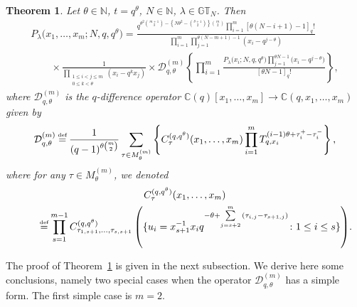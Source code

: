 \documentclass[pdftex]{sigma}
\numberwithin{equation}{section}
\newcommand\myeq{\mathrel{\stackrel{\makebox[0pt]{\mbox{\normalfont\tiny def}}}{=}}}
\newtheorem{thm}{Theorem}[section]
\newcommand{\C}{\mathbb{C}}
\newcommand{\N}{\mathbb{N}}
\newcommand{\GT}{\mathbb{GT}}
\newcommand{\DD}{\mathcal{D}}
\begin{document}
\begin{thm}\label{macdonaldthm3}
Let $\theta\in\N$, $t = q^{\theta}$, $N\in\N$, $\lambda\in\GT_N$. Then
\begin{gather}
P_{\lambda}\big(x_1, \dots, x_m; N, q, q^{\theta}\big) = \frac{q^{\theta^2 {m+ 1 \choose 3} - \left\{ N\theta^2 - {\theta + 1 \choose 2} \right\}{m \choose 2}}\prod\limits_{i=1}^m{[\theta(N - i +1) - 1]_q!}}{\prod\limits_{i=1}^m{\prod\limits_{j=1}^{\theta(N - m + 1) - 1}{(x_i - q^{j-\theta})}}}\nonumber\\
\qquad{}
\times\frac{1}{\prod_{\substack{1\leq i<j\leq m \\ 0\leq k < \theta}}{(x_i - q^k x_j)}}\times\DD^{(m)}_{q, \theta} \left\{ \prod_{i=1}^m{\frac{P_{\lambda}\big(x_i; N, q, q^{\theta}\big)\prod\limits_{j=1}^{\theta N-1}{\big(x_i - q^{j-\theta}\big)}}{[\theta N-1]_q!}}\right\},\label{macdonaldthm3eqn}
\end{gather}
where $\DD^{(m)}_{q, \theta}$ is the $q$-difference operator $\C(q)[x_1, \dots, x_m] \longrightarrow \C(q, x_1, \dots, x_m)$ given by
\begin{gather}\label{macdonaldthm3Dq}
\DD^{(m)}_{q, \theta} \myeq \frac{1}{(q - 1)^{\theta {m \choose 2}}}\sum_{\tau\in M^{(m)}_{\theta}}\left\{ C_{\tau}^{(q, q^{\theta})}(x_1, \dots, x_m)\prod_{i = 1}^m{T_{q, x_i}^{(i-1)\theta + \tau_i^+ - \tau_i^-}}\right\},
\end{gather}
where for any $\tau\in M_{\theta}^{(m)}$, we denoted
\begin{gather}
C_{\tau}^{(q, q^{\theta})}(x_1, \dots, x_m) \nonumber\\
\qquad{} \myeq \prod_{s = 1}^{m-1}{C_{\tau_{1, s+1}, \dots, \tau_{s, s+1}}^{(q, q^{\theta})}\left(\{u_i = x_{s+1}^{-1}x_iq^{-\theta + \sum\limits_{j=s+2}^m{(\tau_{i, j} - \tau_{s+1, j})}}\colon 1\leq i \leq s\} \right)}.\label{eq:Ccoeff}
\end{gather}
\end{thm}

The proof of Theorem~\ref{macdonaldthm3} is given in the next subsection. We derive here some conclusions, namely two special cases when the operator $\DD_{q, \theta}^{(m)}$ has a simple form. The f\/irst simple case is $m = 2$.
\end{document}
